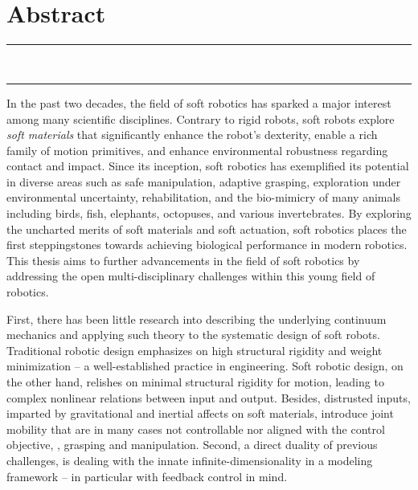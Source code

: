 
\chapter*{\vspace{-45mm}\\ Abstract} %
\vspace{-15mm}
\begin{center}
\rule{\textwidth}{.75pt}\vspace*{1mm}
\textbf{{\large \maintitle} \\[1.0em]}
\rule{\textwidth}{.75pt}
\end{center}


In the past two decades, the field of soft robotics has sparked a major interest among many scientific disciplines. Contrary to rigid robots, soft robots explore \emph{soft materials} that significantly enhance the robot’s dexterity, enable a rich family of motion primitives, and enhance environmental robustness regarding contact and impact. Since its inception, soft robotics has exemplified its potential in diverse areas such as safe manipulation, adaptive grasping, exploration under environmental uncertainty, rehabilitation, and the bio-mimicry of many animals including birds, fish, elephants, octopuses, and various invertebrates. By exploring the uncharted merits of soft materials and soft actuation, soft robotics places the first steppingstones towards achieving biological performance in modern robotics. This thesis aims to further advancements in the field of soft robotics by addressing the open multi-disciplinary challenges within this young field of robotics.

\par First, there has been little research into describing the underlying continuum mechanics and applying such theory to the systematic design of soft robots. Traditional robotic design emphasizes on high structural rigidity and weight minimization -- a well-established practice in engineering. Soft robotic design, on the other hand, relishes on minimal structural rigidity for motion, leading to complex nonlinear relations between input and output. Besides, distrusted inputs, imparted by gravitational and inertial affects on soft materials, introduce joint mobility that are in many cases not controllable nor aligned with the control objective, \eg, grasping and manipulation. %
Second, a direct duality of previous challenges, is dealing with the innate infinite-dimensionality in a modeling framework -- in particular with feedback control in mind.

